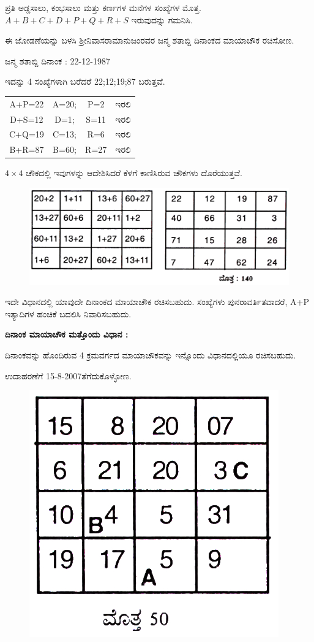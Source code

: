 ಪ್ರತಿ ಅಡ್ಡಸಾಲು, ಕಂಭಸಾಲು ಮತ್ತು ಕರ್ಣಗಳ ಮನೆಗಳ ಸಂಖ್ಯೆಗಳ ಮೊತ್ತ. $A+B+C+ D+ P+ Q+ R+ S$ ಇರುವುದನ್ನು ಗಮನಿಸಿ.

ಈ ಜೋಡಣೆಯನ್ನು ಬಳಸಿ ಶ್ರೀನಿವಾಸರಾಮಾನುಜಂರವರ ಜನ್ಮ ಶತಾಬ್ದಿ ದಿನಾಂಕದ ಮಾಯಾಚೌಕ ರಚಿಸೋಣ.

ಜನ್ಮ ಶತಾಬ್ದಿ ದಿನಾಂಕ : 22-12-1987

ಇದನ್ನು 4 ಸಂಖ್ಯೆಗಳಾಗಿ ಬರೆದರೆ 22;12;19;87 ಬರುತ್ತವೆ.

\begin{tabular}{cccc}
A+P=22 & A=20; & P=2 & ಇರಲಿ\\
D+S=12 & D=1; & S=11 & ಇರಲಿ\\
C+Q=19 & C=13; & R=6 & ಇರಲಿ\\
B+R=87 & B=60; & R=27 & ಇರಲಿ
\end{tabular}

$4 \times 4$ ಚೌಕದಲ್ಲಿ ಇವುಗಳನ್ನು ಆದೇಶಿಸಿದರೆ ಕೆಳಗೆ ಕಾಣಿಸಿರುವ ಚೌಕಗಳು ದೊರೆಯುತ್ತವೆ.
\begin{figure}[H]
\includegraphics[scale=.9]{src/figures/chap3/fig3-45.jpg}
\end{figure}

ಇದೇ ವಿಧಾನದಲ್ಲಿ ಯಾವುದೇ ದಿನಾಂಕದ ಮಾಯಾಚೌಕ ರಚಿಸಬಹುದು. ಸಂಖ್ಯೆಗಳು ಪುನರಾವರ್ತಿತವಾದರೆ, A+P ಇತ್ಯಾದಿಗಳ ಹಂಚಿಕೆ ಬದಲಿಸಿ ನಿವಾರಿಸಬಹುದು.

\noindent \textbf{ದಿನಾಂಕ ಮಾಯಾಚೌಕ ಮತ್ತೊಂದು ವಿಧಾನ :}

ದಿನಾಂಕವನ್ನು ಹೊಂದಿರುವ 4 ಕ್ರಮವರ್ಗದ ಮಾಯಾಚೌಕವನ್ನು ಇನ್ನೊಂದು ವಿಧಾನದಲ್ಲಿಯೂ ರಚಿಸಬಹುದು.

ಉದಾಹರಣೆಗೆ 15-8-2007ತೆಗೆದುಕೊಳ್ಳೋಣ.

	\begin{figure}[H]
	\includegraphics{src/figures/chap3/fig3-46.jpg}
	\end{figure}

